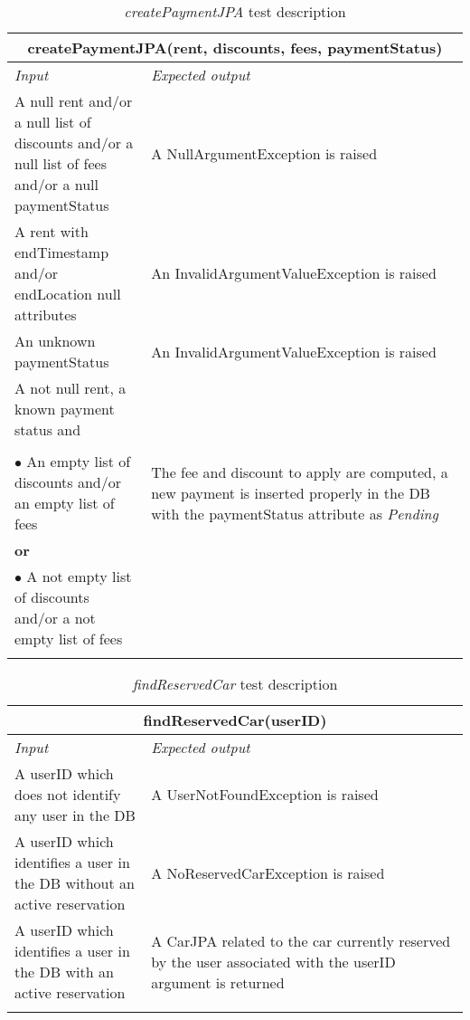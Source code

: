 \clearpage

\begin{longtable}{p{0.3\linewidth}p{0.7\linewidth}}
\multicolumn{2}{c}{\textbf{createPaymentJPA(rent, discounts, fees, paymentStatus)}} \\
\toprule
\emph{Input} & \emph{Expected output} \\
\midrule
A null rent and/or a null list of discounts and/or a null list of fees and/or a null paymentStatus & A NullArgumentException is raised\\
\midrule
A rent with endTimestamp and/or endLocation null attributes & An InvalidArgumentValueException is raised \\
\midrule
An unknown paymentStatus & An InvalidArgumentValueException is raised \\
\midrule
A not null rent, a known payment status and \\\\
$\bullet$ An empty list of discounts and/or an empty list of fees & The fee and discount to apply are computed, a new payment is inserted properly in the DB with the paymentStatus attribute as \emph{Pending}\\
\textbf{or} \\
$\bullet$ A not empty list of discounts and/or a not empty list of fees\\
\bottomrule
\caption{\emph{createPaymentJPA} test description}
\end{longtable}

\begin{longtable}{p{0.3\linewidth}p{0.7\linewidth}}
\multicolumn{2}{c}{\textbf{findReservedCar(userID)}} \\
\toprule
\emph{Input} & \emph{Expected output} \\
\midrule
A userID which does not identify any user in the DB & A UserNotFoundException is raised\\
\midrule
A userID which identifies a user in the DB without an active reservation & A NoReservedCarException is raised \\
\midrule
A userID which identifies a user in the DB with an active reservation & A CarJPA related to the car currently reserved by the user associated with the userID argument is returned \\
\bottomrule
\caption{\label{tbl:findReservedCar}\emph{findReservedCar} test description}
\end{longtable}

